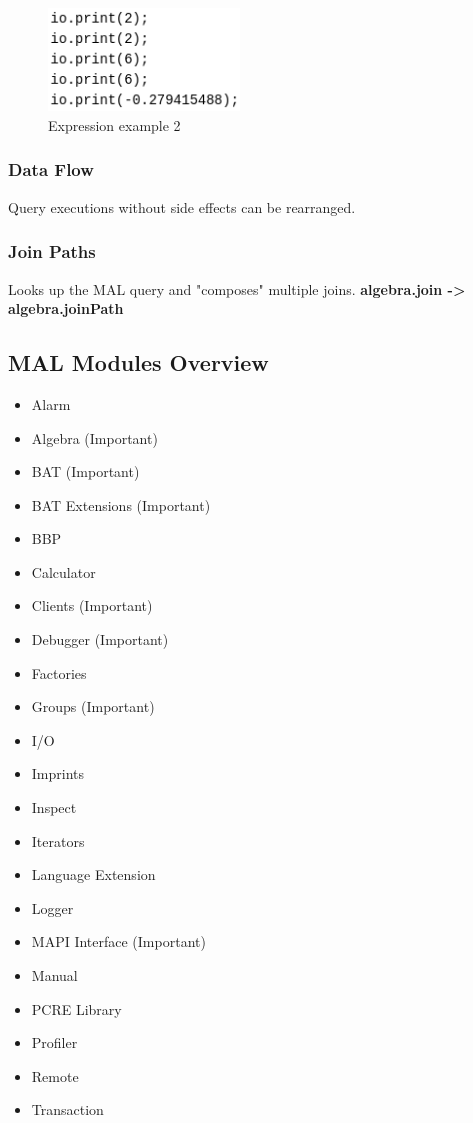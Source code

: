 \documentclass[11pt]{article}
\begin{document}
\begin{figure}[htbp]
\centering
\includegraphics[width=2.0in]{./Pictures/const-exps-eval-1+.png}
\caption{\label{fig:org9bc8cbf}
Expression example 2}
\end{figure}


\subsubsection{Data Flow}
\label{sec:org4cde6d9}
Query executions without side effects can be rearranged.

\subsubsection{Join Paths}
\label{sec:org893930b}
Looks up the MAL query and "composes" multiple joins. \textbf{algebra.join -> algebra.joinPath}


\subsection{MAL Modules Overview}
\label{sec:org765af6e}
\begin{itemize}
\item Alarm
\item Algebra (Important)
\item BAT (Important)
\item BAT Extensions (Important)
\item BBP
\item Calculator
\item Clients (Important)
\item Debugger (Important)
\item Factories
\item Groups (Important)
\item I/O
\item Imprints
\item Inspect
\item Iterators
\item Language Extension
\item Logger
\item MAPI Interface (Important)
\item Manual
\item PCRE Library
\item Profiler
\item Remote
\item Transaction
\end{itemize}
\end{document}
